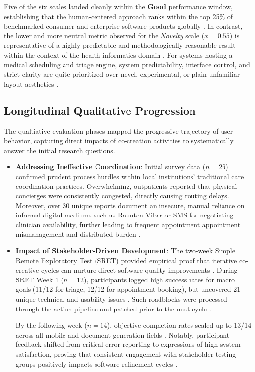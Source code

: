 \documentclass[manuscript, screen, review]{acmart}
\begin{document}
Five of the six scales landed cleanly within the \textbf{Good} performance window, establishing that the human-centered approach ranks within the top 25\% of benchmarked consumer and enterprise software products globally \cite{hinderks_user}. In contrast, the lower and more neutral metric observed for the \textit{Novelty} scale ($\bar{x} = 0.55$) is representative of a highly predictable and methodologically reasonable result within the context of the health informatics domain \cite{schrepp_2023_user}. For systems hosting a medical scheduling and triage engine, system predictability, interface control, and strict clarity are quite prioritized over novel, experimental, or plain unfamiliar layout aesthetics \cite{laugwitz_2008_construction}. 

\subsection{Longitudinal Qualitative Progression}
\label{sub:stakeholder_feedback}
The qualtiative evaluation phases mapped the progressive trajectory of user behavior, capturing direct impacts of co-creation activities to systematically answer the initial research questions. 

\begin{itemize}
  \item \textbf{Addressing Ineffective Coordination}: Initial survey data ($n=26$) confirmed prudent process hurdles within local institutions' traditional care coordination practices. Overwhelming, outpatients reported that physical concierges were consistently congested, directly causing routing delays. Moreover, over 30 unique reports document an insecure, manual reliance on informal digital mediums such as Rakuten Viber or SMS for negotiating clinician availability, further leading to frequent appointment appointment mismanagement and distributed burden \cite{Rodriguez_A,Chang682}. 
  \item \textbf{Impact of Stakeholder-Driven Development}: The two-week Simple Remote Exploratory Test (SRET) provided empirical proof that iterative co-creative cycles can nurture direct software quality improvements \cite{lewis2012usability,Kip2025CeHRes}. During SRET Week 1 ($n=12$), participants logged high success rates for macro goals (11/12 for triage, 12/12 for appointment booking), but uncovered 21 unique technical and usability issues \cite{lewis2012usability}. Such roadblocks were processed through the action pipeline and patched prior to the next cycle \cite{lewis2012usability}.
  
  By the following week ($n=14$), objective completion rates scaled up to 13/14 across all mobile and document generation fields \cite{lewis2012usability}. Notably, participant feedback shifted from critical error reporting to expressions of high system satisfaction, proving that consistent engagement with stakeholder testing groups positively impacts software refinement cycles \cite{lewis2012usability}. 
\end{itemize}
\end{document}
